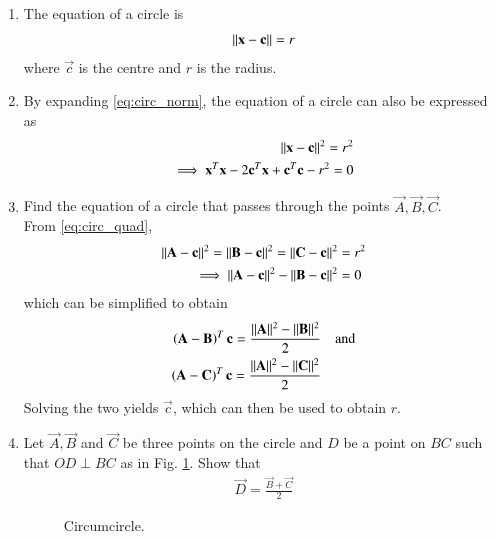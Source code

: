 \renewcommand{\theequation}{\theenumi}
\begin{enumerate}[label=\arabic*.,ref=\thesubsection.\theenumi]
\item The equation of a circle is 
\begin{align}
\label{eq:circ_norm}
\lVert\mathbf{x}-\mathbf{c}\rVert = r
\end{align}
%
where $\vec{c}$ is the centre and $r$ is the radius.
\item By expanding \eqref{eq:circ_norm}, the equation of a circle can also be expressed as
%
\begin{align}
\label{eq:circ_quad}
\lVert\mathbf{x}-\mathbf{c}\rVert^2 = r^2&
\\
\implies \mathbf{x}^T\mathbf{x}-2\mathbf{c}^T\mathbf{x} + \mathbf{c}^T\mathbf{c}-r^2 = 0
\end{align}
\item Find the equation of a circle that passes through the points $\vec{A},\vec{B},\vec{C}$.
\\
\solution From \eqref{eq:circ_quad},
\begin{align}
\lVert\mathbf{A}-\mathbf{c}\rVert^2 = \lVert\mathbf{B}-\mathbf{c}\rVert^2 = \lVert\mathbf{C}-\mathbf{c}\rVert^2 &= r^2
\\
\implies \lVert\mathbf{A}-\mathbf{c}\rVert^2 - \lVert\mathbf{B}-\mathbf{c}\rVert^2 &=0
\end{align}
which can be simplified to obtain
\begin{align}
\left(\mathbf{A}-\mathbf{B}\right)^T\mathbf{c}=\frac{\lVert\mathbf{A}\rVert^2 - \lVert\mathbf{B}\rVert^2}{2}& \quad \text{and}
\\
\left(\mathbf{A}-\mathbf{C}\right)^T\mathbf{c}=\frac{\lVert\mathbf{A}\rVert^2 - \lVert\mathbf{C}\rVert^2}{2}& 
\end{align}
%
Solving the two yields $\vec{c}$, which can then be used to obtain $r$.
\item Let $\vec{A},\vec{B}$ and $\vec{C}$ be three points on the circle and 
$D$ be a point on $BC$ such that
$OD \perp BC$ as in Fig. \ref{fig:ccircle}.  Show that 
\begin{align}
\vec{D}=\frac{\vec{B}+\vec{C}}{2}
\end{align}
%
\begin{figure}[!ht]
	\begin{center}
		
		\resizebox{\columnwidth}{!}{}
	\end{center}
	\caption{Circumcircle.}
	\label{fig:ccircle}	
\end{figure}



\end{enumerate}
